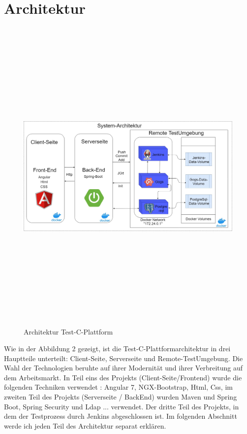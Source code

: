 \documentclass[a4paper,12pt,oneside]{book}
\begin{document}
\section{Architektur}
\begin{figure}[h!]
	\begin{center}
		\includegraphics[width=16cm, height=16cm]{Test-C-Plattform-Arch.jpg}
		\caption{Architektur Test-C-Plattform } 
		\label{ Architektur Test-C-Plattform } 
	\end{center}
\end{figure}
Wie in der Abbildung 2 gezeigt, ist die Test-C-Plattformarchitektur in drei Hauptteile unterteilt: Client-Seite, Serverseite und Remote-TestUmgebung.
\newline
Die Wahl der Technologien beruhte auf ihrer Modernität und ihrer Verbreitung auf dem Arbeitsmarkt. In Teil eins des Projekts (Client-Seite/Frontend) wurde die folgenden Techniken verwendet : Angular 7, NGX-Bootstrap, Html, Css, im zweiten Teil des Projekts (Serverseite / BackEnd) wurden Maven und Spring Boot, Spring Security und Ldap ... verwendet. Der dritte Teil des Projekts, in dem der Testprozess durch Jenkins abgeschlossen ist.
\newline
Im folgenden Abschnitt werde ich jeden Teil des Architektur separat erklären.
\end{document}
